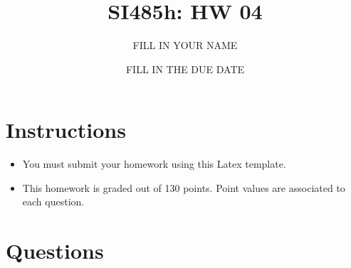 \documentclass{article}[9pt]
\title{SI485h: HW 04}
\date{FILL IN THE DUE DATE}
\author{FILL IN YOUR NAME}
\begin{document}
\maketitle
\section*{Instructions}

\begin{itemize}
\item You must submit your homework using this Latex template.

\item This homework is graded out of 130 points. Point values are associated to each question.
\end{itemize}

\section*{Questions}
\label{sec:orgd7f8042}
\end{document}
